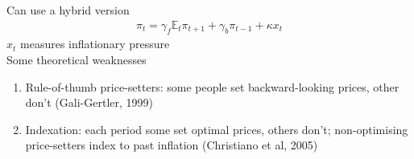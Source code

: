 \documentclass{beamer}
\begin{document}
\begin{frame}
  Can use a hybrid version
  \begin{align}
    \pi_t = \gamma_f \mathbb{E}_t\pi_{t+1} +\gamma_b \pi_{t-1} + \kappa x_t
  \end{align}
  $x_t$ measures inflationary pressure\\
  Some theoretical weaknesses
  \begin{enumerate}
    \item Rule-of-thumb price-setters: some people set backward-looking prices, other don't (Gali-Gertler, 1999)
    \item Indexation: each period some set optimal prices, others don't; non-optimising price-setters index to past inflation (Christiano et al, 2005)
  \end{enumerate}
\end{frame}


\end{document}
